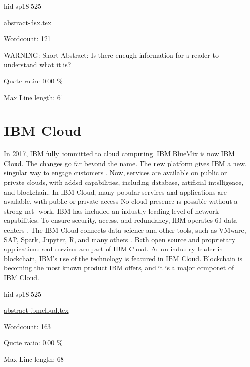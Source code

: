 \begin{IU}

hid-sp18-525

\href{https://github.com/cloudmesh-community/hid-sp18-525/blob/master//technology/abstract-dsx.tex}{abstract-dsx.tex}

 

Wordcount: 121

WARNING: Short Abstract: Is there enough information for a reader to understand what it is?


Quote ratio: 0.00 \%
 
Max Line length: 61
\end{IU}

\section{IBM Cloud}


In 2017, IBM fully committed to cloud computing. IBM BlueMix
is now IBM Cloud. The changes go far beyond the name. The new 
platform gives IBM a new, singular way to engage customers 
\cite{hid-sp18-525-cloud}. Now, services are available on public or 
private clouds, with added capabilities, including database, 
artificial intelligence, and blockchain\cite{hid-sp18-525-cloud}.
In IBM Cloud, many popular services and applications are 
available, with public or private access No cloud presence 
is possible without a strong net- work. IBM has included an 
industry leading level of network capabilities. To ensure 
security, access, and redundancy, IBM operates 60 data centers 
\cite{hid-sp18-525-cloud}.
The IBM Cloud connects data science and other tools, such as 
VMware, SAP, Spark, Jupyter, R, and many others 
\cite{hid-sp18-525-cloud}. Both open source and proprietary 
applications and services are part of IBM Cloud.
As an industry leader in blockchain, IBM's use of the 
technology is featured in IBM Cloud. Blockchain is becoming 
the most known product IBM offers, and it is a major componet
of IBM Cloud\cite{hid-sp18-525-cloud}.


\begin{IU}

hid-sp18-525

\href{https://github.com/cloudmesh-community/hid-sp18-525/blob/master//technology/abstract-ibmcloud.tex}{abstract-ibmcloud.tex}

 

Wordcount: 163


Quote ratio: 0.00 \%
 
Max Line length: 68
\end{IU}

